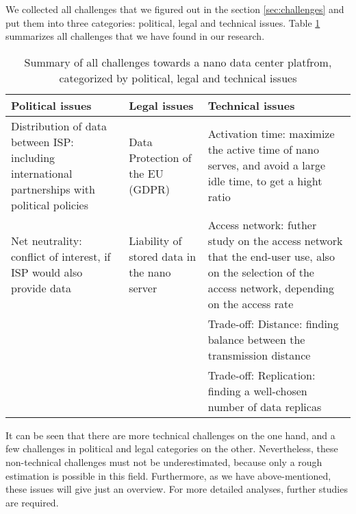 We collected all challenges that we figured out in the section \ref{sec:challenges} and put them into three categories: political, legal and technical issues. Table \ref{tab:summary} summarizes all challenges that we have found in our research. 

\begin{table}
\begin{minipage}{\columnwidth}
\begin{center}
\begin{tabular}{lll}
\toprule
Political issues & Legal issues & Technical issues \\
\hline
\parbox{.3\linewidth}{Distribution of data between ISP: including international partnerships with political policies} & \parbox{.3\linewidth}{Data Protection of the EU (GDPR)} & 
\parbox[c][2cm]{.3\linewidth}{Activation time: maximize the active time of nano serves, and avoid a large idle time, to get a hight ratio} \\


\parbox{.3\linewidth}{Net neutrality: conflict of interest, if ISP would also provide data} & 
\parbox{.3\linewidth}{Liability of stored data in the nano server} & 
\parbox[c][2.5cm]{.3\linewidth}{Access network: futher study on the access network that the end-user use, also on the selection of the access network, depending on the access rate} \\


\parbox{.3\linewidth}{} & 
\parbox{.3\linewidth}{} & 
\parbox[c][1.5cm]{.3\linewidth}{Trade-off: Distance: finding balance between the transmission distance} \\

\parbox{.3\linewidth}{} & 
\parbox{.3\linewidth}{} & 
\parbox[c][1.5cm]{.3\linewidth}{Trade-off: Replication: finding a well-chosen number of data replicas} \\				
\bottomrule
\end{tabular}
\end{center}
\bigskip\centering
\end{minipage}
\caption{Summary of all challenges towards a nano data center platfrom, categorized by political, legal and technical issues}\label{tab:summary}
\end{table}

It can be seen that there are more technical challenges on the one hand, and a few challenges in political and legal categories on the other. Nevertheless, these non-technical challenges must not be underestimated, because only a rough estimation is possible in this field. Furthermore, as we have 
above-mentioned, these issues will give just an overview. For more 
detailed analyses, further studies are required.
